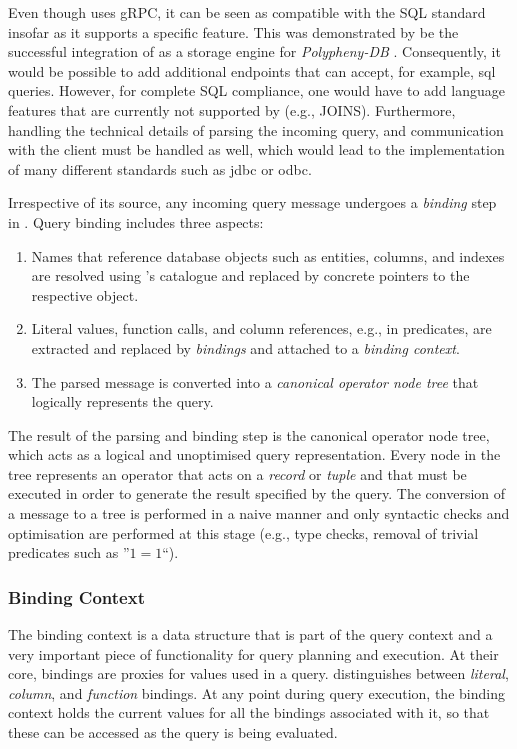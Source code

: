 Even though \cottontail{} uses gRPC, it can be seen as compatible with the SQL standard insofar as it supports a specific feature. This was demonstrated by be the successful integration of \cottontail{} as a storage engine for \emph{Polypheny-DB} \cite{Vogt:2018Polypheny,Vogt:2020Polypheny}. Consequently, it would be possible to add additional endpoints that can accept, for example, \acrshort{sql} queries. However, for complete SQL compliance, one would have to add language features that are currently not supported by \cottontail{} (e.g., JOINS). Furthermore, handling the technical details of parsing the incoming query, and communication with the client must be handled as well, which would lead to the implementation of many different standards such as \acrshort{jdbc} or \acrshort{odbc}.

Irrespective of its source, any incoming query message undergoes a \emph{binding} step in \cottontail{}. Query binding includes three aspects:

\begin{enumerate}
    \item Names that reference database objects such as entities, columns, and indexes are resolved using \cottontail{}'s catalogue and replaced by concrete pointers to the respective object.
    \item Literal values, function calls, and column references, e.g., in predicates, are extracted and replaced by \emph{bindings} and attached to a \emph{binding context}.
    \item The parsed message is converted into a \emph{canonical operator node tree} that logically represents the query.
\end{enumerate}

The result of the parsing and binding step is the canonical operator node tree, which acts as a logical and unoptimised query representation.  Every node in the tree represents an operator that acts on a \emph{record} or \emph{tuple} and that must be executed in order to generate the result specified by the query. The conversion of a message to a tree is performed in a naive manner and only syntactic checks and optimisation are performed at this stage (e.g., type checks, removal of trivial predicates such as ''$1 = 1$``).

\subsubsection{Binding Context}
The binding context is a data structure that is part of the query context and a very important piece of functionality for query planning and execution. At their core, bindings are proxies for values used in a query. \cottontail{} distinguishes between \emph{literal}, \emph{column}, and \emph{function} bindings. At any point during query execution, the binding context holds the current values for all the bindings associated with it, so that these can be accessed as the query is being evaluated.

